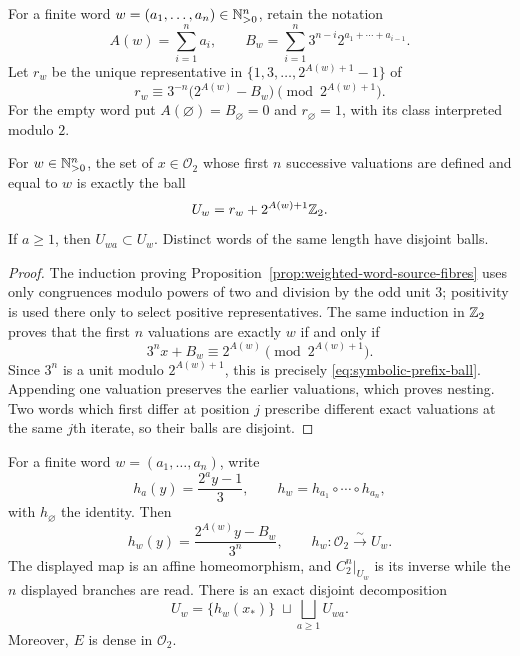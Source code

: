 For a finite word $w=(a_1,\ldots,a_n)\in\mathbb{N}_{>0}^n$, retain the notation
\[
 A(w)=\sum_{i=1}^n a_i,
 \qquad
 B_w=\sum_{i=1}^n3^{n-i}2^{a_1+\cdots+a_{i-1}}.
\]
Let $r_w$ be the unique representative in
$\{1,3,\ldots,2^{A(w)+1}-1\}$ of
\begin{equation}
\label{eq:symbolic-canonical-prefix-residue}
 r_w\equiv3^{-n}\bigl(2^{A(w)}-B_w\bigr)
       \pmod{2^{A(w)+1}}.
\end{equation}
For the empty word put $A(\varnothing)=B_\varnothing=0$ and
$r_\varnothing=1$, with its class interpreted modulo $2$.

\begin{lemma}
\label{lem:symbolic-Z2-prefix-cylinders}
For $w\in\mathbb{N}_{>0}^n$, the set of $x\in\mathcal O_2$ whose first $n$
successive valuations are defined and equal to $w$ is exactly the ball
\begin{equation}
\label{eq:symbolic-prefix-ball}
 U_w=r_w+2^{A(w)+1}\mathbb{Z}_{2}.
\end{equation}
If $a\geq1$, then $U_{wa}\subset U_w$.  Distinct words of the same length
have disjoint balls.
\end{lemma}

\begin{proof}
The induction proving
Proposition~\ref{prop:weighted-word-source-fibres} uses only congruences
modulo powers of two and division by the odd unit $3$; positivity is used
there only to select positive representatives.  The same induction in
$\mathbb{Z}_{2}$ proves that the first $n$ valuations are exactly $w$ if and only if
\[
 3^n x+B_w\equiv2^{A(w)}\pmod{2^{A(w)+1}}.
\]
Since $3^n$ is a unit modulo $2^{A(w)+1}$, this is precisely
\eqref{eq:symbolic-prefix-ball}.  Appending one valuation preserves the
earlier valuations, which proves nesting.  Two words which first differ at
position $j$ prescribe different exact valuations at the same $j$th
iterate, so their balls are disjoint.
\end{proof}

\begin{lemma}
\label{lem:symbolic-inverse-branch-homeomorphism}
For a finite word $w=(a_1,\ldots,a_n)$, write
\[
 h_a(y)=\frac{2^ay-1}{3},
 \qquad
 h_w=h_{a_1}\circ\cdots\circ h_{a_n},
\]
with $h_\varnothing$ the identity.  Then
\begin{equation}
\label{eq:symbolic-inverse-branch-word}
 h_w(y)=\frac{2^{A(w)}y-B_w}{3^n},
 \qquad
 h_w:\mathcal O_2\xrightarrow{\sim}U_w.
\end{equation}
The displayed map is an affine homeomorphism, and $C_2^n|_{U_w}$ is its inverse while the
$n$ displayed branches are read.  There is an exact disjoint decomposition
\begin{equation}
\label{eq:symbolic-prefix-ball-partition}
 U_w=\{h_w(x_*)\}\;\sqcup\!
       \bigsqcup_{a\geq1}U_{wa}.
\end{equation}
Moreover, $E$ is dense in $\mathcal O_2$.
\end{lemma}

